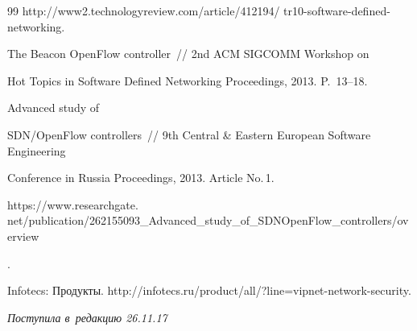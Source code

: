 {{\begin{thebibliography}{99}
{http://www2.technologyreview.com/article/412194/ tr10-software-defined-networking}. 




 The Beacon OpenFlow controller~/\!\!/ 2nd ACM SIGCOMM Workshop on 


Hot Topics in Software Defined Networking Proceedings, 2013. P.~13--18.




 Advanced study of 


SDN/OpenFlow controllers~/\!\!/ 9th Central \& Eastern European Software Engineering 


Conference in Russia Proceedings, 2013. Article No.\,1.


{\sf 


https://www.researchgate. net/publication/262155093\_Advanced\_study\_of\_SDNOpenFlow\_controllers/overview}. 




Infotecs: Продукты. {\sf http://infotecs.ru/product/all/?line=vipnet-network-security}.





        \end{thebibliography}


} }








\vspace*{-3pt}





\hfill{\small\textit{Поступила в~редакцию 26.11.17}}






























